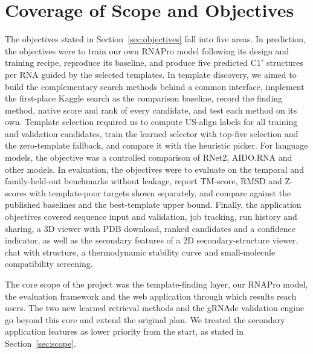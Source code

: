\documentclass{FastFyp}
\begin{document}
\section{Coverage of Scope and Objectives}
\label{sec:coverage}
The objectives stated in Section~\ref{sec:objectives} fall into five areas. In prediction, the objectives were to train our own RNAPro model following its design and training recipe, reproduce its baseline, and produce five predicted C1$'$ structures per RNA guided by the selected templates. In template discovery, we aimed to build the complementary search methods behind a common interface, implement the first-place Kaggle search as the comparison baseline, record the finding method, native score and rank of every candidate, and test each method on its own. Template selection required us to compute US-align labels for all training and validation candidates, train the learned selector with top-five selection and the zero-template fallback, and compare it with the heuristic picker. For language models, the objective was a controlled comparison of RNet2, AIDO.RNA and other models. In evaluation, the objectives were to evaluate on the temporal and family-held-out benchmarks without leakage, report TM-score, RMSD and Z-scores with template-poor targets shown separately, and compare against the published baselines and the best-template upper bound. Finally, the application objectives covered sequence input and validation, job tracking, run history and sharing, a 3D viewer with PDB download, ranked candidates and a confidence indicator, as well as the secondary features of a 2D secondary-structure viewer, chat with structure, a thermodynamic stability curve and small-molecule compatibility screening.

The core scope of the project was the template-finding layer, our RNAPro model, the evaluation framework and the web application through which results reach users. The two new learned retrieval methods and the gRNAde validation engine go beyond this core and extend the original plan. We treated the secondary application features as lower priority from the start, as stated in Section~\ref{sec:scope}.
\end{document}
